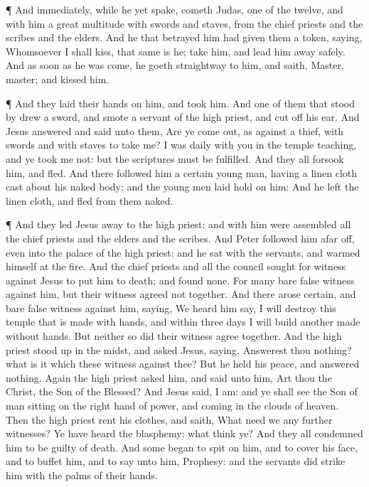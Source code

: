  ¶ And immediately, while he yet spake, cometh Judas, one
of the twelve, and with him a great multitude with swords and staves,
from the chief priests and the scribes and the elders.  And
he that betrayed him had given them a token, saying, Whomsoever I shall
kiss, that same is he; take him, and lead him away safely. 
And as soon as he was come, he goeth straightway to him, and saith,
Master, master; and kissed him.

 ¶ And they laid their hands on him, and took him.
 And one of them that stood by drew a sword, and smote a
servant of the high priest, and cut off his ear.  And Jesus
answered and said unto them, Are ye come out, as against a thief, with
swords and with staves to take me?  I was daily with you in
the temple teaching, and ye took me not: but the scriptures must be
fulfilled.  And they all forsook him, and fled.
 And there followed him a certain young man, having a linen
cloth cast about his naked body; and the young men laid hold on him:
 And he left the linen cloth, and fled from them naked.

 ¶ And they led Jesus away to the high priest: and with him
were assembled all the chief priests and the elders and the scribes.
 And Peter followed him afar off, even into the palace of
the high priest: and he sat with the servants, and warmed himself at the
fire.  And the chief priests and all the council sought for
witness against Jesus to put him to death; and found none. 
For many bare false witness against him, but their witness agreed not
together.  And there arose certain, and bare false witness
against him, saying,  We heard him say, I will destroy this
temple that is made with hands, and within three days I will build
another made without hands.  But neither so did their
witness agree together.  And the high priest stood up in
the midst, and asked Jesus, saying, Answerest thou nothing? what is it
which these witness against thee?  But he held his peace,
and answered nothing. Again the high priest asked him, and said unto
him, Art thou the Christ, the Son of the Blessed?  And
Jesus said, I am: and ye shall see the Son of man sitting on the right
hand of power, and coming in the clouds of heaven.  Then
the high priest rent his clothes, and saith, What need we any further
witnesses?  Ye have heard the blasphemy: what think ye? And
they all condemned him to be guilty of death.  And some
began to spit on him, and to cover his face, and to buffet him, and to
say unto him, Prophesy: and the servants did strike him with the palms
of their hands.

